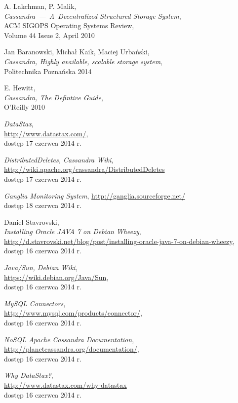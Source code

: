 \documentclass{article} %
\begin{document}
\begin{thebibliography}{10}%

A. Lakchman, P. Malik,\\
\emph{Cassandra~---~A~Decentralized Structured Storage System},\\
ACM SIGOPS Operating Systems Review,\\
Volume 44 Issue 2, April 2010

Jan Baranowski, Michał Kaik, Maciej Urbański,\\
\emph{Cassandra, Highly available, scalable storage system},\\
Politechnika Poznańska 2014

E. Hewitt,\\
\emph{Cassandra, The Defintive Guide},\\
O'Reilly 2010

\emph{DataStax},\\
\url{http://www.datastax.com/},\\
dostęp 17 czerwca 2014 r.

\emph{DistributedDeletes, Cassandra Wiki},\\
\url{http://wiki.apache.org/cassandra/DistributedDeletes}\\
dostęp 17 czerwca 2014 r.

\emph{Ganglia Monitoring System},
\url{http://ganglia.sourceforge.net/}\\
dostęp 18 czerwca 2014 r.

Daniel Stavrovski,\\
\emph{Installing Oracle JAVA 7 on Debian Wheezy},\\
\url{http://d.stavrovski.net/blog/post/installing-oracle-java-7-on-debian-wheezy},\\
dostęp 16 czerwca 2014 r.

\emph{Java/Sun, Debian Wiki},\\
\url{https://wiki.debian.org/Java/Sun},\\
dostęp 16 czerwca 2014 r.

\emph{MySQL Connectors},\\
\url{http://www.mysql.com/products/connector/},\\
dostęp 16 czerwca 2014 r.

\emph{NoSQL Apache Cassandra Documentation},\\
\url{http://planetcassandra.org/documentation/},\\
dostęp 16 czerwca 2014 r.

\emph{Why DataStax?},\\
\url{http://www.datastax.com/why-datastax}\\
dostęp 16 czerwca 2014 r.

\end{thebibliography}
\end{document}
